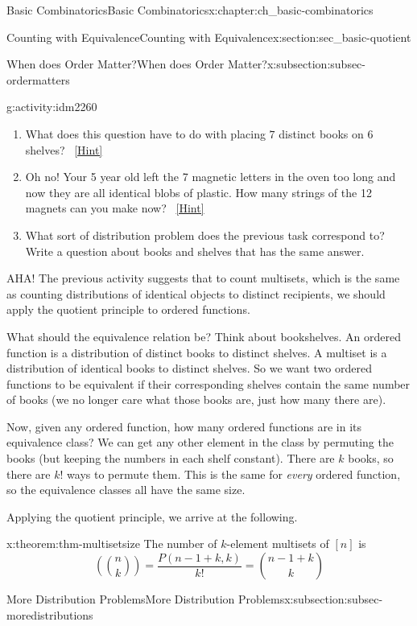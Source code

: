 \documentclass[oneside,10pt,]{book}
\numberwithin{equation}{chapter}
\newcommand{\mchoose}[2]{\left(\!\binom{#1}{#2}\!\right)}
\begin{document}
\begin{chapterptx}{Basic Combinatorics}{}{Basic Combinatorics}{}{}{x:chapter:ch_basic-combinatorics}
\begin{sectionptx}{Counting with Equivalence}{}{Counting with Equivalence}{}{}{x:section:sec_basic-quotient}
\begin{subsectionptx}{When does Order Matter?}{}{When does Order Matter?}{}{}{x:subsection:subsec-ordermatters}
\begin{activity}{}{g:activity:idm2260}
\begin{enumerate}[font=\bfseries,label=(\alph*),ref=\alph*]
\item{}What does this question have to do with placing \(7\) distinct books on \(6\) shelves?%
\qquad~\hfill{\tiny\hyperlink{g:hint:idm2276-back}{[Hint]}}\item{}Oh no! Your 5 year old left the 7 magnetic letters in the oven too long and now they are all identical blobs of plastic.  How many strings of the 12 magnets can you make now?%
\qquad~\hfill{\tiny\hyperlink{g:hint:idm2284-back}{[Hint]}}\item{}What sort of distribution problem does the previous task correspond to?  Write a question about books and shelves that has the same answer.%
\end{enumerate}
\end{activity}
AHA!  The previous activity suggests that to count multisets, which is the same as counting distributions of identical objects to distinct recipients, we should apply the quotient principle to ordered functions.%
\par
What should the equivalence relation be?  Think about bookshelves.  An ordered function is a distribution of distinct books to distinct shelves.  A multiset is a distribution of identical books to distinct shelves.  So we want two ordered functions to be equivalent if their corresponding shelves contain the same number of books (we no longer care what those books are, just how many there are).%
\par
Now, given any ordered function, how many ordered functions are in its equivalence class?  We can get any other element in the class by permuting the books (but keeping the numbers in each shelf constant).  There are \(k\) books, so there are \(k!\) ways to permute them.  This is the same for \emph{every} ordered function, so the equivalence classes all have the same size.%
\par
Applying the quotient principle, we arrive at the following.%
\begin{theorem}{}{}{x:theorem:thm-multisetsize}%
The number of \(k\)-element multisets of \([n]\) is%
\begin{equation*}
\mchoose{n}{k} = \frac{P(n-1+k, k)}{k!} = \binom{n-1+k}{k}
\end{equation*}
%
\end{theorem}
\end{subsectionptx}
%
%
\typeout{************************************************}
\typeout{************************************************}
%
\begin{subsectionptx}{More Distribution Problems}{}{More Distribution Problems}{}{}{x:subsection:subsec-moredistributions}

\end{subsectionptx}
\end{sectionptx}
\end{chapterptx}
\end{document}
